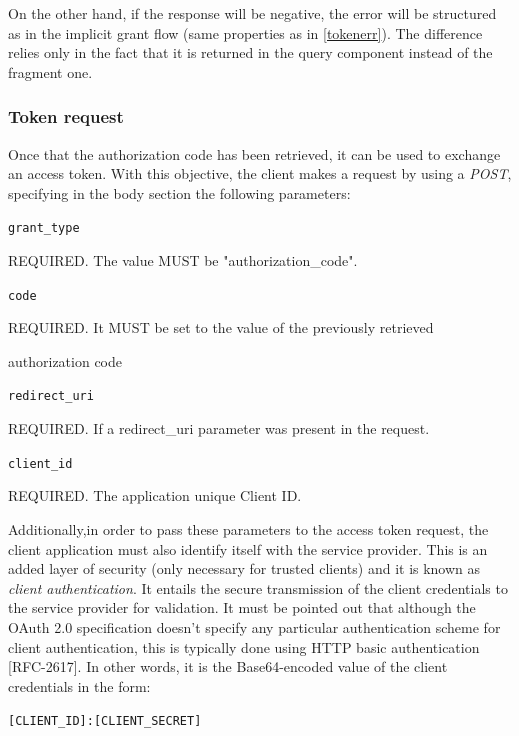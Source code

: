 On the other hand, if the response will be negative, the error will be structured as in the implicit grant flow (same properties as in \ref{tokenerr}). The difference relies only in the fact that it is returned in the query component instead of the fragment one.


\subsubsection{Token request}
Once that the authorization code has been retrieved, it can be used to exchange an access token. With this objective, the client makes a request by using a \textit{POST}, specifying in the body section the following parameters:

\texttt{grant\_type}

\hspace{0.5cm}REQUIRED. The value MUST be "authorization\_code".

\texttt{code}

\hspace{0.5cm}REQUIRED. It MUST be set to the value of the previously retrieved

\hspace{0.5cm}authorization code

\texttt{redirect\_uri}

\hspace{0.5cm}REQUIRED. If a redirect\_uri parameter was present in the request.

\texttt{client\_id}

\hspace{0.5cm}REQUIRED. The application unique Client ID.

\vspace{0.5cm}

Additionally,in order to pass these parameters to the access token request, the client
application must also identify itself with the service provider. This is an added
layer of security (only necessary for trusted clients) and it is known as \textit{client
authentication}.
It entails the secure transmission of the client credentials to the service provider for validation. It must be pointed out that although the OAuth 2.0 specification doesn't specify any particular authentication scheme for client authentication, this is typically done using HTTP basic authentication [RFC-2617].
In other words, it is the Base64-encoded value of the client credentials in
the form:

\hspace{0.5cm}\texttt{[CLIENT\_ID]:[CLIENT\_SECRET]}

